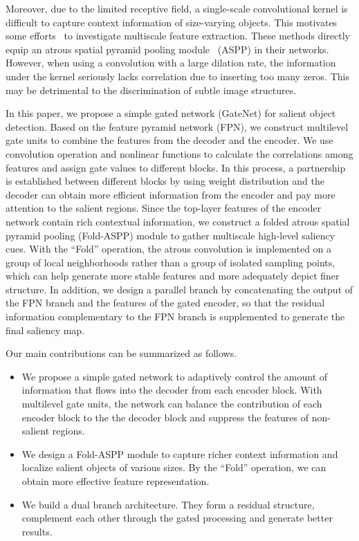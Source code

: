 \documentclass[runningheads]{llncs}
\begin{document}
	Moreover, due to the limited receptive field, a single-scale convolutional kernel is difficult to capture context information of size-varying objects. This motivates some efforts~\cite{R3Net,BMPM} to investigate multiscale feature extraction. These methods directly equip an atrous spatial pyramid pooling module~\cite{Deeplab} (ASPP) in their networks. However, when using a convolution with a large dilation rate, the information under the kernel seriously lacks correlation due to inserting too many zeros. This may be detrimental to the discrimination of subtle image structures.
	
	In this paper, we propose a simple gated network (GateNet) for salient object detection. Based on the feature pyramid network (FPN), we construct multilevel gate units to combine the features from the decoder and the encoder. We use convolution operation and nonlinear functions to calculate the correlations among features and assign gate values to different blocks. In this process, a partnership is established between different blocks by using weight distribution and the decoder can obtain more efficient information from the encoder and pay more attention to the salient regions. Since the top-layer features of the encoder network contain rich contextual information, we construct a folded atrous spatial pyramid pooling (Fold-ASPP) module to gather multiscale high-level saliency cues. With the ``Fold'' operation, the atrous convolution is implemented on a group of local neighborhoods rather than a group of isolated sampling points, which can help generate more stable features and more adequately depict finer structure. In addition, we design a parallel branch by concatenating the output of the FPN branch and the features of the gated encoder, so that the residual information complementary to the FPN branch is supplemented to generate the final saliency map. 
	
	Our main contributions can be summarized as follows.
	\begin{itemize}
		\item We propose a simple gated network to adaptively control the amount of information that flows into the decoder from each encoder block. With multilevel gate units, the network can balance the contribution of each encoder block to the the decoder block and suppress the features of non-salient regions.
		
		\item We design a Fold-ASPP module to capture richer context information and localize salient objects of various sizes. By the ``Fold'' operation, we can obtain more effective feature representation.
		
		\item We build a dual branch architecture. They form a residual structure, complement each other through the gated processing and generate better results.    
	\end{itemize}
	
\end{document}
